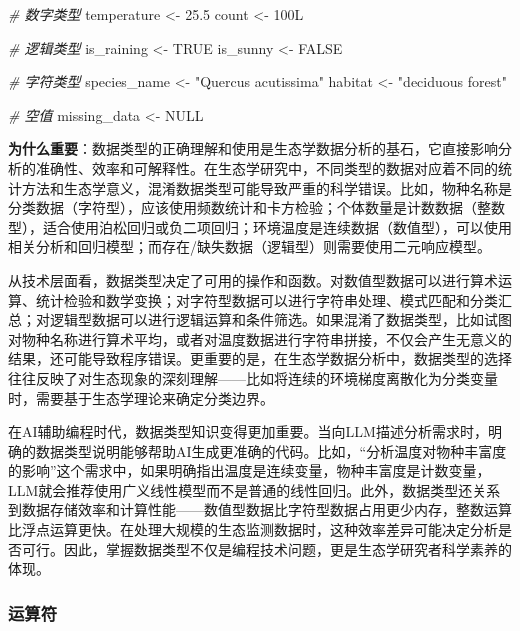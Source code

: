 \documentclass[
  twoside]{book}
\newenvironment{Shaded}{\begin{snugshade}}{\end{snugshade}}
\newcommand{\CommentTok}[1]{\textcolor[rgb]{0.56,0.35,0.01}{\textit{#1}}}
\newcommand{\ConstantTok}[1]{\textcolor[rgb]{0.56,0.35,0.01}{#1}}
\newcommand{\DataTypeTok}[1]{\textcolor[rgb]{0.13,0.29,0.53}{#1}}
\newcommand{\DecValTok}[1]{\textcolor[rgb]{0.00,0.00,0.81}{#1}}
\newcommand{\FloatTok}[1]{\textcolor[rgb]{0.00,0.00,0.81}{#1}}
\newcommand{\NormalTok}[1]{#1}
\newcommand{\OtherTok}[1]{\textcolor[rgb]{0.56,0.35,0.01}{#1}}
\newcommand{\StringTok}[1]{\textcolor[rgb]{0.31,0.60,0.02}{#1}}
\begin{document}
\begin{Shaded}
\begin{Highlighting}[]
\CommentTok{\# 数字类型}
\NormalTok{temperature }\OtherTok{\textless{}{-}} \FloatTok{25.5}
\NormalTok{count }\OtherTok{\textless{}{-}} \DecValTok{100}\DataTypeTok{L}

\CommentTok{\# 逻辑类型}
\NormalTok{is\_raining }\OtherTok{\textless{}{-}} \ConstantTok{TRUE}
\NormalTok{is\_sunny }\OtherTok{\textless{}{-}} \ConstantTok{FALSE}

\CommentTok{\# 字符类型}
\NormalTok{species\_name }\OtherTok{\textless{}{-}} \StringTok{"Quercus acutissima"}
\NormalTok{habitat }\OtherTok{\textless{}{-}} \StringTok{"deciduous forest"}

\CommentTok{\# 空值}
\NormalTok{missing\_data }\OtherTok{\textless{}{-}} \ConstantTok{NULL}
\end{Highlighting}
\end{Shaded}

\textbf{为什么重要}：数据类型的正确理解和使用是生态学数据分析的基石，它直接影响分析的准确性、效率和可解释性。在生态学研究中，不同类型的数据对应着不同的统计方法和生态学意义，混淆数据类型可能导致严重的科学错误。比如，物种名称是分类数据（字符型），应该使用频数统计和卡方检验；个体数量是计数数据（整数型），适合使用泊松回归或负二项回归；环境温度是连续数据（数值型），可以使用相关分析和回归模型；而存在/缺失数据（逻辑型）则需要使用二元响应模型。

从技术层面看，数据类型决定了可用的操作和函数。对数值型数据可以进行算术运算、统计检验和数学变换；对字符型数据可以进行字符串处理、模式匹配和分类汇总；对逻辑型数据可以进行逻辑运算和条件筛选。如果混淆了数据类型，比如试图对物种名称进行算术平均，或者对温度数据进行字符串拼接，不仅会产生无意义的结果，还可能导致程序错误。更重要的是，在生态学数据分析中，数据类型的选择往往反映了对生态现象的深刻理解------比如将连续的环境梯度离散化为分类变量时，需要基于生态学理论来确定分类边界。

在AI辅助编程时代，数据类型知识变得更加重要。当向LLM描述分析需求时，明确的数据类型说明能够帮助AI生成更准确的代码。比如，``分析温度对物种丰富度的影响''这个需求中，如果明确指出温度是连续变量，物种丰富度是计数变量，LLM就会推荐使用广义线性模型而不是普通的线性回归。此外，数据类型还关系到数据存储效率和计算性能------数值型数据比字符型数据占用更少内存，整数运算比浮点运算更快。在处理大规模的生态监测数据时，这种效率差异可能决定分析是否可行。因此，掌握数据类型不仅是编程技术问题，更是生态学研究者科学素养的体现。

\hypertarget{ux8fd0ux7b97ux7b26}{%
\subsubsection{运算符}\label{ux8fd0ux7b97ux7b26}}
\end{document}
